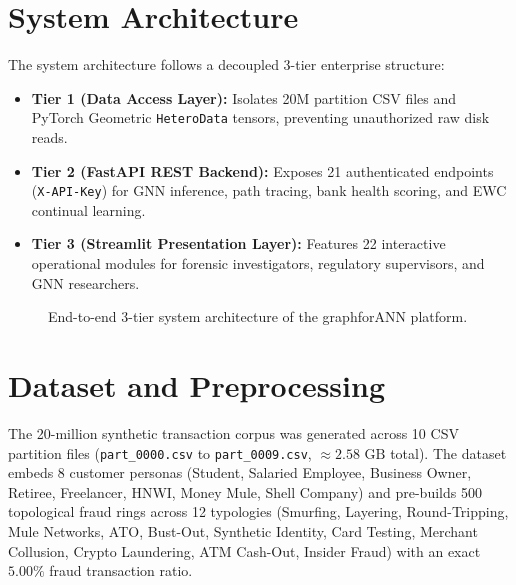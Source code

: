 \documentclass[conference]{IEEEtran}
\begin{document}
\section{System Architecture}
The system architecture follows a decoupled 3-tier enterprise structure:
\begin{itemize}
    \item \textbf{Tier 1 (Data Access Layer):} Isolates 20M partition CSV files and PyTorch Geometric \texttt{HeteroData} tensors, preventing unauthorized raw disk reads.
    \item \textbf{Tier 2 (FastAPI REST Backend):} Exposes 21 authenticated endpoints (\texttt{X-API-Key}) for GNN inference, path tracing, bank health scoring, and EWC continual learning.
    \item \textbf{Tier 3 (Streamlit Presentation Layer):} Features 22 interactive operational modules for forensic investigators, regulatory supervisors, and GNN researchers.
\end{itemize}

\begin{figure}[htbp]
\centering
{}
\caption{End-to-end 3-tier system architecture of the graphforANN platform.}
\label{fig:arch}
\end{figure}

\section{Dataset and Preprocessing}
The 20-million synthetic transaction corpus was generated across 10 CSV partition files (\texttt{part\_0000.csv} to \texttt{part\_0009.csv}, $\approx 2.58\text{ GB}$ total). The dataset embeds 8 customer personas (Student, Salaried Employee, Business Owner, Retiree, Freelancer, HNWI, Money Mule, Shell Company) and pre-builds 500 topological fraud rings across 12 typologies (Smurfing, Layering, Round-Tripping, Mule Networks, ATO, Bust-Out, Synthetic Identity, Card Testing, Merchant Collusion, Crypto Laundering, ATM Cash-Out, Insider Fraud) with an exact $5.00\%$ fraud transaction ratio.
\end{document}
